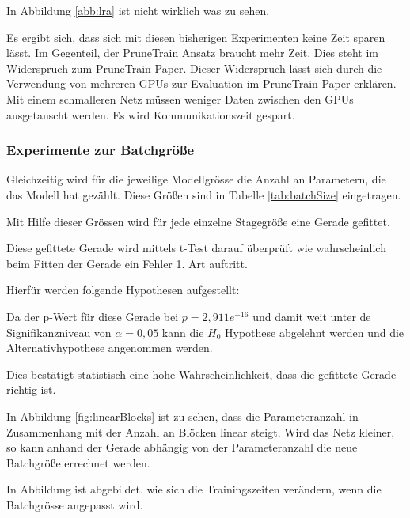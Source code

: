  In Abbildung \ref{abb:lra} ist nicht wirklich was zu sehen, 
 
 
 
Es ergibt sich, dass sich mit diesen bisherigen Experimenten keine Zeit sparen lässt. Im Gegenteil, der PruneTrain Ansatz braucht mehr Zeit. Dies steht im Widerspruch zum PruneTrain Paper. Dieser Widerspruch lässt sich durch die Verwendung von mehreren GPUs zur Evaluation im PruneTrain Paper erklären. Mit einem schmalleren Netz müssen weniger Daten zwischen den GPUs ausgetauscht werden. Es wird Kommunikationszeit gespart.






\subsubsection{Experimente zur Batchgröße}



Gleichzeitig wird für die jeweilige Modellgrösse die Anzahl an Parametern, die das Modell hat gezählt. Diese Größen sind in Tabelle \ref{tab:batchSize} eingetragen. 


Mit Hilfe dieser Grössen wird für jede einzelne Stagegröße eine Gerade gefittet.

Diese gefittete Gerade wird mittels t-Test darauf überprüft wie wahrscheinlich beim Fitten der Gerade ein Fehler 1. Art auftritt.

Hierfür werden folgende Hypothesen aufgestellt:


Da der p-Wert für diese Gerade bei $p=2,911e^{-16}$ und damit weit unter de Signifikanzniveau von $\alpha=0,05$ kann die $H_0$ Hypothese abgelehnt werden und die Alternativhypothese angenommen werden.

Dies bestätigt statistisch eine hohe Wahrscheinlichkeit, dass die gefittete Gerade richtig ist.



In Abbildung \ref{fig:linearBlocks} ist zu sehen, dass die Parameteranzahl in Zusammenhang mit der Anzahl an Blöcken linear steigt.
Wird das Netz kleiner, so kann anhand der Gerade abhängig von der Parameteranzahl die neue Batchgröße errechnet werden.







In Abbildung  ist abgebildet. wie sich die Trainingszeiten verändern, wenn die Batchgrösse angepasst wird.



